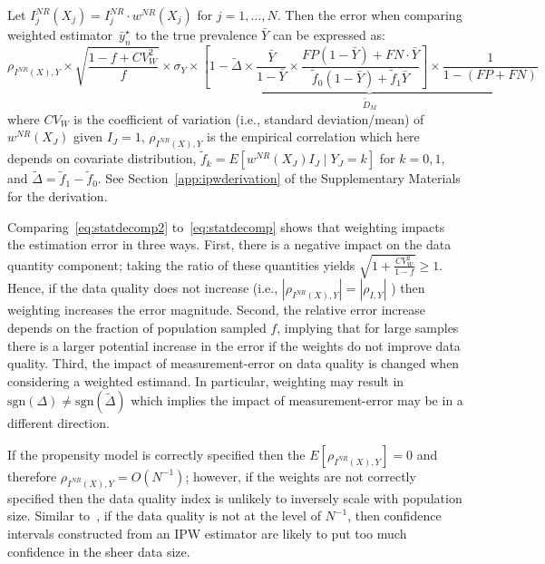 \documentclass[11pt]{amsart}
\numberwithin{equation}{section}
\theoremstyle{plain}
\begin{document}
 Let $I_j^{NR} (X_j) = I_j^{NR}  \cdot w^{NR}(X_j)$ for $j=1,\ldots,N$.  Then the error when comparing weighted estimator~$\bar y_n^\star$ to the true prevalence $\bar Y$ can be expressed as:
 \begin{equation}
 \label{eq:statdecomp2}
 \rho_{I^{NR} (X), Y} \times \sqrt{\frac{1-f+ CV^2_W}{f}} \times \sigma_{Y} \times \underbrace{\left[ 1 - \tilde \Delta \times \frac{\bar Y}{1-\bar Y} \times \frac{FP(1-\bar Y) + FN \cdot \bar Y}{\tilde f_0 (1-\bar Y) + \tilde f_1 \bar Y} \right] \times \frac{1}{1-(FP+FN)}}_{\tilde D_M}
 \end{equation}
 where $CV_W$ is the coefficient of variation (i.e., standard deviation/mean) of $w^{NR} (X_J)$ given $I_J = 1$, $\rho_{I^{NR} (X), Y}$ is the empirical correlation which here depends on covariate distribution, $\tilde f_k = E[ w^{NR} (X_J) I_J \mid Y_J = k]$ for $k=0,1$, and $\tilde \Delta = \tilde f_1 - \tilde f_0$.  See Section~\ref{app:ipwderivation} of the Supplementary Materials for the derivation.

 Comparing~\eqref{eq:statdecomp2} to~\eqref{eq:statdecomp} shows that weighting impacts the estimation error in three ways.  First, there is a negative impact on the data quantity component; taking the ratio of these quantities yields
 $\sqrt{1 + \frac{CV_W^2}{1-f}} \geq 1$.  Hence, if the data quality does not increase (i.e., $| \rho_{I^{NR} (X), Y} | = | \rho_{I,Y}|$ ) then weighting increases the error magnitude.  Second, the relative error increase depends on the fraction of population sampled $f$, implying that for large samples there is a larger potential increase in the error if the weights do not improve data quality. Third, the impact of measurement-error on data quality is changed when considering a weighted estimand. In particular, weighting may result in $\text{sgn}(\Delta) \neq \text{sgn} (\tilde \Delta)$ which implies the impact of measurement-error may be in a different direction.

 If the propensity model is correctly specified then the $E [ \rho_{I^{NR} (X), Y} ] = 0$ and therefore $\rho_{I^{NR} (X), Y} = O(N^{-1})$; however, if the weights are not correctly specified then the data quality index is unlikely to inversely scale with population size.
 Similar to~\cite{Meng2018}, if the data quality is not at the level of $N^{-1}$, then confidence intervals constructed from an IPW estimator are likely to put too much confidence in the sheer data size.
\end{document}
